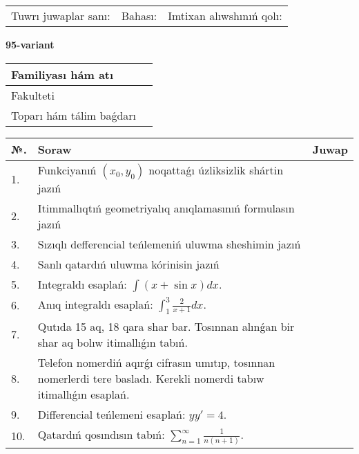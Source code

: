 \documentclass{article}
\begin{document}
\vspace{1cm}

\begin{tabular}{ c c c }
Tuwrı juwaplar sanı: \underline{\hspace{2cm}} & Bahası: \underline{\hspace{2cm}} & Imtixan alıwshınıń qolı: \underline{\hspace{2cm}} \\
\end{tabular}

\newpage

\begin{center}\textbf{95-variant}\end{center}

\bgroup
\def\arraystretch{1.5}
\begin{tabular}{ |m{6cm}|m{10cm}| }
  \hline
  Familiyası hám atı & \\
  \hline
  Fakulteti &\\
  \hline
  Toparı hám tálim baǵdarı & \\
  \hline
\end{tabular}
\egroup

\vspace{0.5cm}

\bgroup
\def\arraystretch{2}
\begin{tabular}{ |l|m{8cm}|m{7cm}| }
  \hline
  №. & Soraw & Juwap \\
  \hline
  1. & Funkciyanıń $(x_{0}, y_{0})$ noqattaǵı úzliksizlik shártin jazıń &  \\
  \hline
  2. & Itimmallıqtıń geometriyalıq anıqlamasınıń formulasın jazıń &  \\
  \hline
  3. & Sızıqlı defferencial teńlemeniń uluwma sheshimin jazıń &  \\
  \hline
  4. & Sanlı qatardıń uluwma kórinisin jazıń &  \\
  \hline
  5. & Integraldı esaplań: $\displaystyle\int (x + \sin x)dx$. &  \\
  \hline
  6. & Anıq integraldı esaplań: $\displaystyle\int_{1}^{3}{\frac{2}{x + 1}dx}$. &  \\
  \hline
  7. & Qutıda 15 aq, 18 qara shar bar. Tosınnan alınǵan bir shar aq bolıw itimallıǵın tabıń. &  \\
  \hline
  8. & Telefon nomerdiń aqırǵı cifrasın umıtıp, tosınnan nomerlerdi tere basladı. Kerekli nomerdi tabıw itimallıǵın esaplań. &  \\
  \hline
  9. & Differencial teńlemeni esaplań: $yy'= 4$. &  \\
  \hline
  10. & Qatardıń qosındısın tabıń: $\displaystyle\sum_{n = 1}^{\infty}\frac{1}{n(n + 1)}$. &  \\
  \hline
\end{tabular}
\egroup
\end{document}

